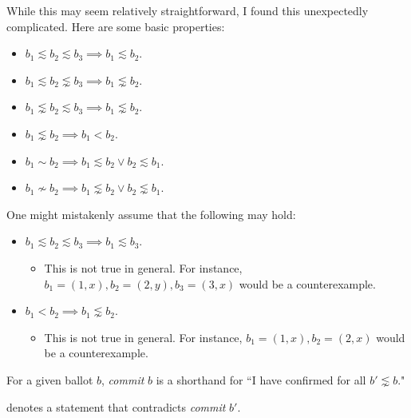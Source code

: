\begin{exmp}
    While this may seem relatively straightforward, I found this unexpectedly complicated.
    Here are some basic properties:
    \begin{itemize}
        \item
            $b_1 \lesssim b_2 \lesssim b_3 \implies b_1 \lesssim b_2$.
        \item
            $b_1 \lesssim b_2 \lnsim b_3 \implies b_1 \lnsim b_2$.
        \item
            $b_1 \lnsim b_2 \lesssim b_3 \implies b_1 \lnsim b_2$.
        \item
            $b_1 \lnsim b_2 \implies b_1 < b_2$.
        \item
            $b_1 \sim b_2 \implies b_1 \lesssim b_2 \lor b_2 \lesssim b_1$.
        \item
            $b_1 \nsim b_2 \implies b_1 \lnsim b_2 \lor b_2 \lnsim b_1$.
    \end{itemize}

    One might mistakenly assume that the following may hold:
    \begin{itemize}
        \item
            $b_1 \lesssim b_2 \lesssim b_3 \implies b_1 \lesssim b_3$.
            \begin{itemize}
                \item
                    This is not true in general.
                    For instance, $b_1 = (1, x), b_2 = (2, y), b_3 = (3, x)$ would be a counterexample.
            \end{itemize}
        \item
            $b_1 < b_2  \implies b_1 \lnsim b_2$.
            \begin{itemize}
                \item
                    This is not true in general.
                    For instance, $b_1 = (1, x), b_2 = (2, x)$ would be a counterexample.
            \end{itemize}
    \end{itemize}
\end{exmp}

\begin{defn}[Commit]
    For a given ballot $b$, \textit{commit} $b$ is a shorthand for ``I have confirmed  for all $b' \lnsim b$."
\end{defn}

 denotes a statement that contradicts \textit{commit} $b'$.

